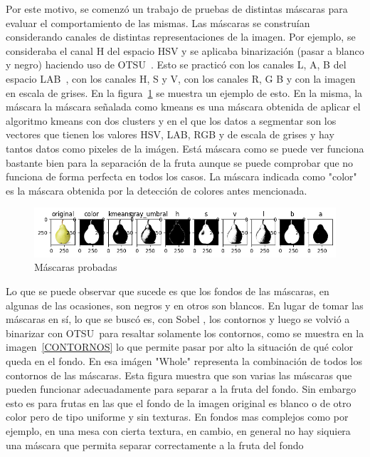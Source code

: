 \documentclass[a4paper, 12pt]{article}
\begin{document}
Por este motivo, se comenzó un trabajo de pruebas de distintas máscaras para evaluar el comportamiento de las mismas. Las máscaras se construían considerando canales de distintas representaciones de la imagen. Por ejemplo, se consideraba el canal H del espacio HSV y se aplicaba binarización (pasar a blanco y negro) haciendo uso de OTSU~\cite{YouTubeDigitalSreeni2}. Esto se practicó con los canales L, A, B del espacio LAB~\cite{WikipediaLabColorSpace}, con los canales H, S y V, con los canales R, G B y con la imagen en escala de grises. En la figura~\ref{MASCARAS} se muestra un ejemplo de esto. En la misma, la máscara la máscara señalada como kmeans es una máscara obtenida de aplicar el algoritmo kmeans con dos clusters y en el que los datos a segmentar son los vectores que tienen los valores HSV, LAB, RGB y de escala de grises y hay tantos datos como pixeles de la imágen. Está máscara como se puede ver funciona bastante bien para la separación de la fruta aunque se puede comprobar que no funciona de forma perfecta en todos los casos. La máscara indicada como "color" es la máscara obtenida por la detección de colores antes mencionada.

\begin{figure}[!htbp]
    \centering
    \includegraphics[width=\linewidth]{MASCARAS.png}
    \caption{Máscaras probadas}
    \label{MASCARAS}
\end{figure}

Lo que se puede observar que sucede es que los fondos de las máscaras, en algunas de las ocasiones, son negros y en otros son blancos. En lugar de tomar las máscaras en sí, lo que se buscó es, con Sobel \cite{YouTubeDigitalSreeni}, los contornos y luego se volvió a binarizar con OTSU\ para resaltar solamente los contornos, como se muestra en la imagen~\ref{CONTORNOS} lo que permite pasar por alto la situación de qué color queda en el fondo. En esa imágen "Whole" representa la combinación de todos los contornos de las máscaras. Esta figura muestra que son varias las máscaras que pueden funcionar adecuadamente para separar a la fruta del fondo. Sin embargo esto es para frutas en las que el fondo de la imagen original es blanco o de otro color pero de tipo uniforme y sin texturas. En fondos mas complejos como por ejemplo, en una mesa con cierta textura, en cambio, en general no hay siquiera una máscara que permita separar correctamente a la fruta del fondo
\end{document}
